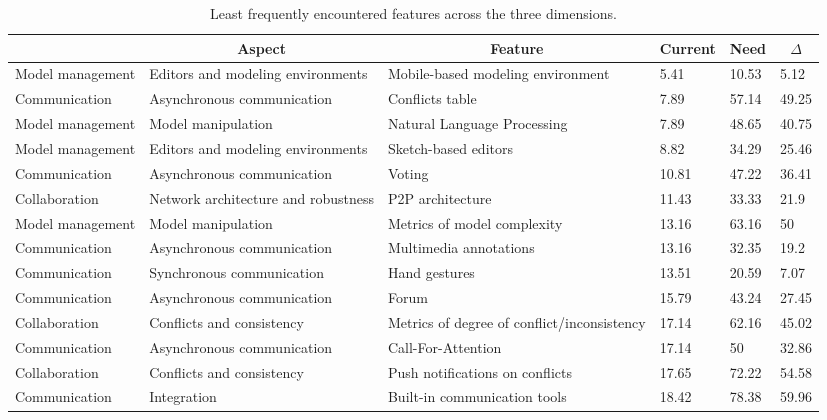 
  \begin{table*}[]
  \centering
  \notsotiny
  \caption{ Least frequently encountered features across the three dimensions.}
\label{tab:least-frequent}
\begin{tabular}{|l|l|l|l|l|l|}
  \hline
  \rowcolor[HTML]{C0C0C0}
    \multicolumn{1}{|c|}{Dimension} & \multicolumn{1}{c|}{Aspect} & \multicolumn{1}{c|}{Feature} & \multicolumn{1}{c|}{Current} & \multicolumn{1}{c|}{Need} & \multicolumn{1}{c|}{$\Delta$} \\ \hline
    Model management & Editors and modeling environments & Mobile-based modeling environment & 5.41 & 10.53 & 5.12 \\ \hline 
Communication & Asynchronous communication & Conflicts table & 7.89 & 57.14 & 49.25 \\ \hline 
Model management & Model manipulation & Natural Language Processing & 7.89 & 48.65 & 40.75 \\ \hline 
Model management & Editors and modeling environments & Sketch-based editors & 8.82 & 34.29 & 25.46 \\ \hline 
Communication & Asynchronous communication & Voting & 10.81 & 47.22 & 36.41 \\ \hline 
Collaboration & Network architecture and robustness & P2P architecture & 11.43 & 33.33 & 21.9 \\ \hline 
Model management & Model manipulation & Metrics of model complexity & 13.16 & 63.16 & 50 \\ \hline 
Communication & Asynchronous communication & Multimedia annotations & 13.16 & 32.35 & 19.2 \\ \hline 
Communication & Synchronous communication & Hand gestures & 13.51 & 20.59 & 7.07 \\ \hline 
Communication & Asynchronous communication & Forum & 15.79 & 43.24 & 27.45 \\ \hline 
Collaboration & Conflicts and consistency & Metrics of degree of conflict/inconsistency & 17.14 & 62.16 & 45.02 \\ \hline 
Communication & Asynchronous communication & Call-For-Attention & 17.14 & 50 & 32.86 \\ \hline 
Collaboration & Conflicts and consistency & Push notifications on conflicts & 17.65 & 72.22 & 54.58 \\ \hline 
Communication & Integration & Built-in communication tools & 18.42 & 78.38 & 59.96 \\ \hline 

\end{tabular}
\end{table*}
